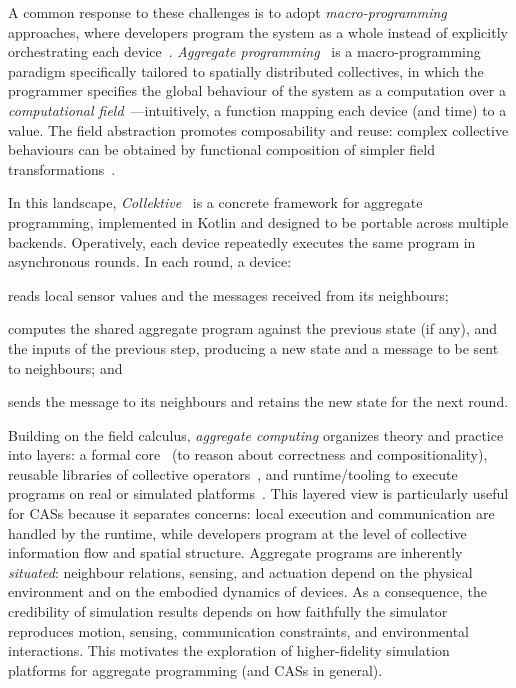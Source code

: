 A common response to these challenges is to adopt \emph{macro-programming}~\cite{DBLP:journals/csur/Casadei23} approaches,
where developers
program the system as a whole instead of explicitly orchestrating each device~\cite{viroli2019jlap}.
%
\emph{Aggregate programming}~\cite{BealIEEEComputer2015} is a macro-programming paradigm specifically tailored to spatially distributed
collectives, in which the programmer specifies the global behaviour of the system as a computation over
a \emph{computational field}~\cite{DBLP:journals/tocl/AudritoVDPB19}---intuitively, a function mapping each device (and time) to a value.
%
The field abstraction promotes composability and reuse: complex collective behaviours can be obtained by
functional composition of simpler field transformations~\cite{DBLP:journals/tomacs/ViroliABDP18}.

In this landscape, \emph{Collektive}~\cite{DBLP:conf/acsos/Cortecchia24} is a concrete framework for aggregate programming,
implemented in Kotlin and designed to be portable across multiple backends.
%
Operatively,
each device repeatedly executes the same program in asynchronous rounds.
In each round, a device:
\begin{inlinelist}
    \item reads local sensor values and the messages received from its neighbours;
    \item computes the shared aggregate program against the previous state (if any), and the inputs of the previous step,
    producing a new state and a message to be sent to neighbours; and
    \item sends the message to its neighbours and retains the new state for the next round.
\end{inlinelist}

Building on the field calculus, \emph{aggregate computing} organizes theory and practice into layers:
a formal core~\cite{DBLP:journals/tocl/AudritoVDPB19} (to reason about correctness and compositionality),
reusable libraries of collective
operators~\cite{DBLP:journals/tomacs/ViroliABDP18},
and runtime/tooling to execute programs on real or simulated platforms~\cite{PianiniSAC2015,DBLP:journals/softx/CasadeiVAP22,DBLP:journals/scp/AudritoT24}.
%
This layered view is particularly useful for \acp{CAS} because it separates concerns:
local execution and communication are handled by the runtime, while developers program at the level of
collective information flow and spatial structure.
%
Aggregate programs are inherently \emph{situated}: neighbour relations, sensing, and actuation depend on the
physical environment and on the embodied dynamics of devices.
%
As a consequence, the credibility of simulation results depends
on how faithfully the simulator reproduces motion, sensing, communication constraints, and environmental
interactions.
%
This motivates the exploration of higher-fidelity simulation platforms for
aggregate programming (and \acp{CAS} in general).



